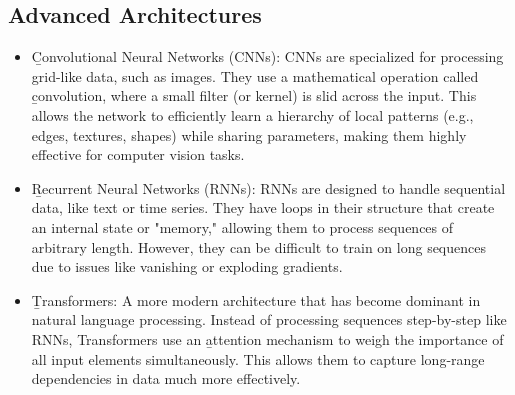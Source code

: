 \subsection{Advanced Architectures}
\begin{itemize}
    \item \b{Convolutional Neural Networks (CNNs):} CNNs are specialized for processing grid-like data, such as images. They use a mathematical operation called \b{convolution}, where a small filter (or kernel) is slid across the input. This allows the network to efficiently learn a hierarchy of local patterns (e.g., edges, textures, shapes) while sharing parameters, making them highly effective for computer vision tasks.
    \item \b{Recurrent Neural Networks (RNNs):} RNNs are designed to handle sequential data, like text or time series. They have loops in their structure that create an internal state or "memory," allowing them to process sequences of arbitrary length. However, they can be difficult to train on long sequences due to issues like vanishing or exploding gradients.
    \item \b{Transformers:} A more modern architecture that has become dominant in natural language processing. Instead of processing sequences step-by-step like RNNs, Transformers use an \b{attention mechanism} to weigh the importance of all input elements simultaneously. This allows them to capture long-range dependencies in data much more effectively.
\end{itemize}
